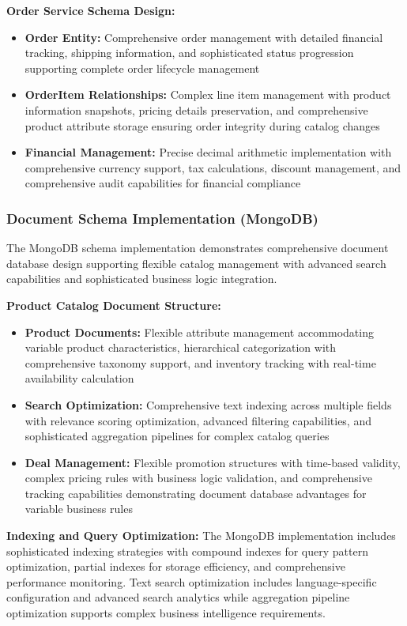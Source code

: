 \textbf{Order Service Schema Design:}
\begin{itemize}
\item \textbf{Order Entity:} Comprehensive order management with detailed financial tracking, shipping information, and sophisticated status progression supporting complete order lifecycle management
\item \textbf{OrderItem Relationships:} Complex line item management with product information snapshots, pricing details preservation, and comprehensive product attribute storage ensuring order integrity during catalog changes
\item \textbf{Financial Management:} Precise decimal arithmetic implementation with comprehensive currency support, tax calculations, discount management, and comprehensive audit capabilities for financial compliance
\end{itemize}

\subsubsection{Document Schema Implementation (MongoDB)}

The MongoDB schema implementation demonstrates comprehensive document database design supporting flexible catalog management with advanced search capabilities and sophisticated business logic integration.

\textbf{Product Catalog Document Structure:}
\begin{itemize}
\item \textbf{Product Documents:} Flexible attribute management accommodating variable product characteristics, hierarchical categorization with comprehensive taxonomy support, and inventory tracking with real-time availability calculation
\item \textbf{Search Optimization:} Comprehensive text indexing across multiple fields with relevance scoring optimization, advanced filtering capabilities, and sophisticated aggregation pipelines for complex catalog queries
\item \textbf{Deal Management:} Flexible promotion structures with time-based validity, complex pricing rules with business logic validation, and comprehensive tracking capabilities demonstrating document database advantages for variable business rules
\end{itemize}

\textbf{Indexing and Query Optimization:}
The MongoDB implementation includes sophisticated indexing strategies with compound indexes for query pattern optimization, partial indexes for storage efficiency, and comprehensive performance monitoring. Text search optimization includes language-specific configuration and advanced search analytics while aggregation pipeline optimization supports complex business intelligence requirements.

